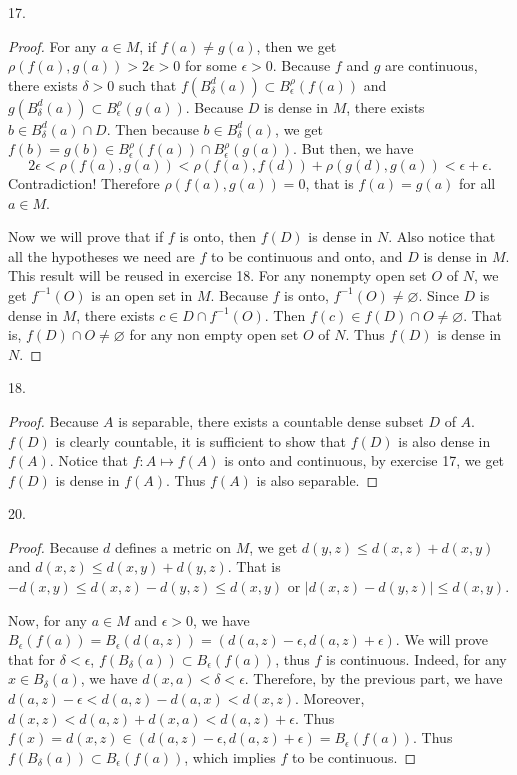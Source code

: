 \documentclass[12pt, a4paper]{article}
\theoremstyle{plain}
\begin{document}
17.
\begin{proof}
For any $a\in M$, if $f(a)\neq g(a)$, then we get $\rho (f(a),g(a))>2\epsilon>0$ for some $\epsilon>0$. Because $f$ and $g$ are continuous, there exists $\delta>0$ such that $f(B_\delta^d(a))\subset B_\epsilon^\rho(f(a))$ and $g(B_\delta^d(a))\subset B_\epsilon^\rho(g(a))$. Because $D$ is dense in $M$, there exists $b\in B_\delta^d(a)\cap D$. Then because $b\in B_\delta^d(a)$, we get $f(b)=g(b)\in B_\epsilon^\rho(f(a))\cap B_\epsilon^\rho(g(a))$. But then, we have
\[
2\epsilon < \rho(f(a),g(a)) < \rho(f(a),f(d)) + \rho(g(d),g(a)) < \epsilon+\epsilon.
\]
Contradiction! Therefore $\rho(f(a),g(a))=0$, that is $f(a)=g(a)$ for all $a\in M$.

Now we will prove that if $f$ is onto, then $f(D)$ is dense in $N$. Also notice that all the hypotheses we need are $f$ to be continuous and onto, and $D$ is dense in $M$. This result will be reused in exercise 18. For any nonempty open set $O$ of $N$, we get $f^{-1}(O)$ is an open set in $M$. Because $f$ is onto, $f^{-1}(O)\neq \varnothing$. Since $D$ is dense in $M$, there exists $c\in D\cap f^{-1}(O)$. Then $f(c)\in f(D)\cap O\neq \varnothing$. That is, $f(D)\cap O\neq \varnothing$ for any non empty open set $O$ of $N$. Thus $f(D)$ is dense in $N$.
\end{proof}

18.
\begin{proof}
Because $A$ is separable, there exists a countable dense subset $D$ of $A$. $f(D)$ is clearly countable, it is sufficient to show that $f(D)$ is also dense in $f(A)$. Notice that $f:A\mapsto f(A)$ is onto and continuous, by exercise 17, we get $f(D)$ is dense in $f(A)$. Thus $f(A)$ is also separable.
\end{proof}

20.
\begin{proof}
Because $d$ defines a metric on $M$, we get $d(y,z)\leq d(x,z)+d(x,y)$ and $d(x,z)\leq d(x,y)+d(y,z)$. That is $-d(x,y)\leq d(x,z)-d(y,z)\leq d(x,y)$ or $|d(x,z)-d(y,z)|\leq d(x,y)$.

Now, for any $a\in M$ and $\epsilon>0$, we have $B_\epsilon(f(a))=B_\epsilon(d(a,z))=(d(a,z)-\epsilon,d(a,z)+\epsilon)$. We will prove that for $\delta<\epsilon$, $f(B_\delta(a))\subset B_\epsilon(f(a))$, thus $f$ is continuous. Indeed, for any $x\in B_\delta(a)$, we have $d(x,a)<\delta<\epsilon$. Therefore, by the previous part, we have $d(a,z)-\epsilon<d(a,z)-d(a,x)<d(x,z)$. Moreover, $d(x,z)<d(a,z)+d(x,a)<d(a,z)+\epsilon$. Thus $f(x)=d(x,z)\in (d(a,z)-\epsilon,d(a,z)+\epsilon)=B_\epsilon(f(a))$. Thus $f(B_\delta(a))\subset B_\epsilon(f(a))$, which implies $f$ to be continuous.
\end{proof}
\end{document}
